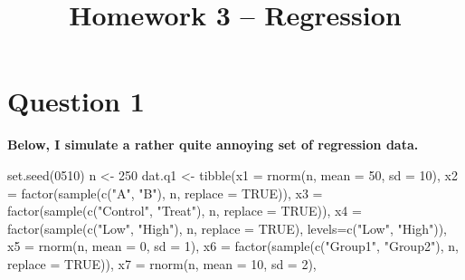 \documentclass[
]{article}
\title{Homework 3 -- Regression}
\author{}
\date{}
\newenvironment{Shaded}{\begin{snugshade}}{\end{snugshade}}
\newcommand{\AttributeTok}[1]{\textcolor[rgb]{0.40,0.45,0.13}{#1}}
\newcommand{\ConstantTok}[1]{\textcolor[rgb]{0.56,0.35,0.01}{#1}}
\newcommand{\DecValTok}[1]{\textcolor[rgb]{0.68,0.00,0.00}{#1}}
\newcommand{\FunctionTok}[1]{\textcolor[rgb]{0.28,0.35,0.67}{#1}}
\newcommand{\NormalTok}[1]{\textcolor[rgb]{0.00,0.23,0.31}{#1}}
\newcommand{\OtherTok}[1]{\textcolor[rgb]{0.00,0.23,0.31}{#1}}
\newcommand{\StringTok}[1]{\textcolor[rgb]{0.13,0.47,0.30}{#1}}
\begin{document}
\maketitle


\normalsize

\normalsize

\section{Question 1}\label{question-1}

\textbf{Below, I simulate a rather quite annoying set of regression
data.}

\scriptsize

\begin{Shaded}
\begin{Highlighting}[numbers=left,,]
\FunctionTok{set.seed}\NormalTok{(}\DecValTok{0510}\NormalTok{)}
\NormalTok{n }\OtherTok{\textless{}{-}} \DecValTok{250}
\NormalTok{dat.q1 }\OtherTok{\textless{}{-}} \FunctionTok{tibble}\NormalTok{(}\AttributeTok{x1 =} \FunctionTok{rnorm}\NormalTok{(n, }\AttributeTok{mean =} \DecValTok{50}\NormalTok{, }\AttributeTok{sd =} \DecValTok{10}\NormalTok{),}
                 \AttributeTok{x2 =} \FunctionTok{factor}\NormalTok{(}\FunctionTok{sample}\NormalTok{(}\FunctionTok{c}\NormalTok{(}\StringTok{"A"}\NormalTok{, }\StringTok{"B"}\NormalTok{), n, }\AttributeTok{replace =} \ConstantTok{TRUE}\NormalTok{)),}
                 \AttributeTok{x3 =} \FunctionTok{factor}\NormalTok{(}\FunctionTok{sample}\NormalTok{(}\FunctionTok{c}\NormalTok{(}\StringTok{"Control"}\NormalTok{, }\StringTok{"Treat"}\NormalTok{), n, }\AttributeTok{replace =} \ConstantTok{TRUE}\NormalTok{)),}
                 \AttributeTok{x4 =} \FunctionTok{factor}\NormalTok{(}\FunctionTok{sample}\NormalTok{(}\FunctionTok{c}\NormalTok{(}\StringTok{"Low"}\NormalTok{, }\StringTok{"High"}\NormalTok{), n, }\AttributeTok{replace =} \ConstantTok{TRUE}\NormalTok{), }\AttributeTok{levels=}\FunctionTok{c}\NormalTok{(}\StringTok{"Low"}\NormalTok{, }\StringTok{"High"}\NormalTok{)),}
                 \AttributeTok{x5 =} \FunctionTok{rnorm}\NormalTok{(n, }\AttributeTok{mean =} \DecValTok{0}\NormalTok{, }\AttributeTok{sd =} \DecValTok{1}\NormalTok{),}
                 \AttributeTok{x6 =} \FunctionTok{factor}\NormalTok{(}\FunctionTok{sample}\NormalTok{(}\FunctionTok{c}\NormalTok{(}\StringTok{"Group1"}\NormalTok{, }\StringTok{"Group2"}\NormalTok{), n, }\AttributeTok{replace =} \ConstantTok{TRUE}\NormalTok{)),}
                 \AttributeTok{x7 =} \FunctionTok{rnorm}\NormalTok{(n, }\AttributeTok{mean =} \DecValTok{10}\NormalTok{, }\AttributeTok{sd =} \DecValTok{2}\NormalTok{),}

\end{Highlighting}
\end{Shaded}
\end{document}
